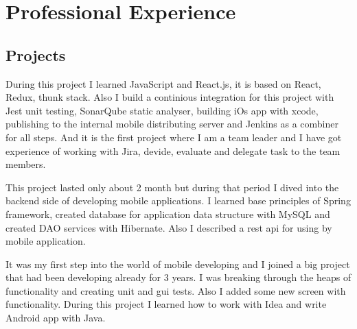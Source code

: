 \documentclass[11pt,a4paper,sans]{moderncv} %
\begin{document}

\section{Professional Experience}




\subsection{Projects}


{During this project I learned JavaScript and React.js, it is based on React, Redux, thunk stack. Also I build a continious integration for this project with Jest unit testing, SonarQube static analyser, building iOs app with xcode, publishing to the internal mobile distributing server and Jenkins as a combiner for all steps. And it is the first project where I am a team leader and I have got experience of working with Jira, devide, evaluate and delegate task to the team members.}

{This project lasted only about 2 month but during that period I dived into the backend side of developing mobile applications. I learned base principles of Spring framework, created database for application data structure with MySQL and created DAO services with Hibernate. Also I described a rest api for using by mobile application.}

{It was my first step into the world of mobile developing and I joined a big project that had been developing already for 3 years. I was breaking through the heaps of functionality and creating unit and gui tests. Also I added some new screen with functionality. During this project I learned how to work with Idea and write Android app with Java.}
\end{document}
